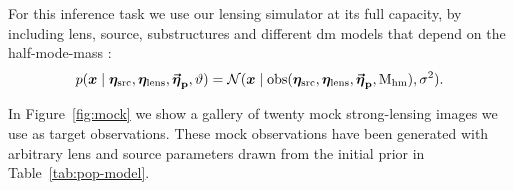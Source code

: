 For this inference task we use our lensing simulator at its full capacity, by including lens, source, substructures and different \gls*{dm} models that depend on the half-mode-mass \mhm:
\begin{equation}
    p(\bm{x}\mid\bm{\eta}_\mathrm{src}, \bm{\eta}_\mathrm{lens},\boldsymbol{\vec{{\bm{\eta}}}_\mathrm{p}}, \vartheta)
    = \mathcal{N}(\bm{x}\mid\mathrm{obs}(\bm{\eta}_\mathrm{src}, \bm{\eta}_\mathrm{lens}, \boldsymbol{\vec{{\bm{\eta}}}_\mathrm{p}}, \mathrm{M_{hm}}), \sigma^2).
\end{equation}

In Figure~\ref{fig:mock} we show a gallery of twenty mock strong-lensing images we use as target observations. These mock observations have been generated with arbitrary lens and source parameters drawn from the initial prior in Table~\ref{tab:pop-model}.


\begin{table}
\begin{center}
\end{center}
\end{table}
